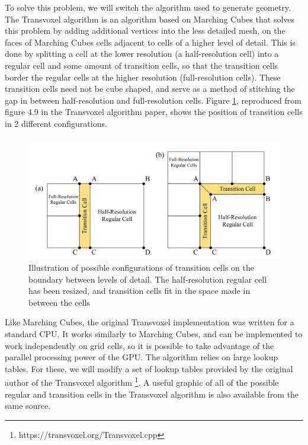 \documentclass[11pt]{article}
\begin{document}
To solve this problem, we will switch the algorithm used to generate geometry. The Transvoxel algorithm \cite{lengyel_2010} is an algorithm based on Marching Cubes that solves this problem by adding additional vertices into the less detailed mesh, on the faces of Marching Cubes cells adjacent to cells of a higher level of detail. This is done by splitting a cell at the lower resolution (a half-resolution cell) into a regular cell and some amount of transition cells, so that the transition cells border the regular cells at the higher resolution (full-resolution cells). These transition cells need not be cube shaped, and serve as a method of stitching the gap in between half-resolution and full-resolution cells. Figure \ref{fig:transition_cells}, reproduced from figure 4.9 in the Transvoxel algorithm paper\cite{lengyel_2010}, shows the position of transition cells in 2 different configurations.
\begin{figure}[H]
  \includegraphics[width=\textwidth]{transition_cells}
  \caption{Illustration of possible configurations of transition cells on the boundary between levels of detail. The half-resolution regular cell has been resized, and transition cells fit in the space made in between the cells}
  \label{fig:transition_cells}
\end{figure}

Like Marching Cubes, the original Transvoxel implementation was written for a standard CPU. It works similarly to Marching Cubes, and can be implemented to work independently on grid cells, so it is possible to take advantage of the parallel processing power of the GPU. The algorithm relies on large lookup tables. For these, we will modify a set of lookup tables provided by the original author of the Transvoxel algorithm \footnote{https://transvoxel.org/Transvoxel.cpp}.
A useful graphic of all of the possible regular and transition cells in the Transvoxel algorithm is also available from the same source\cite{lengyel}.
\end{document}
